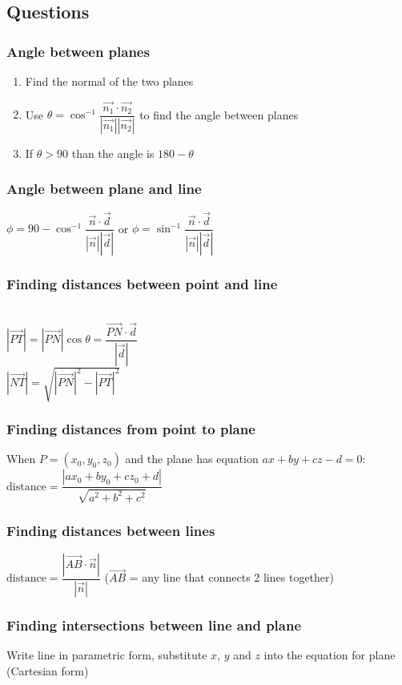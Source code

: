 \subsection{Questions}
\subsubsection{Angle between planes}
\begin{enumerate}
	\item Find the normal of the two planes
	\item Use $\theta = \cos^{-1}\dfrac{\vec{n_1}\cdot\vec{n_2}}{|\vec{n_1}||\vec{n_2}|}$ to find the angle between planes
	\item If $\theta>90$ than the angle is $180-\theta$
\end{enumerate}
\subsubsection{Angle between plane and line}
$\phi = 90-\cos^{-1}\dfrac{\vec{n}\cdot\vec{d}}{|\vec{n}||\vec{d}|}$ or $\phi =\sin^{-1}\dfrac{\vec{n}\cdot\vec{d}}{|\vec{n}||\vec{d}|}$
\subsubsection{Finding distances between point and line}
\\
$|\overrightarrow{PT}| = |\overrightarrow{PN}|\cos \theta = \dfrac{\overrightarrow{PN}\cdot\vec{d}}{|\vec{d}|}$\\ $|\overrightarrow{NT}|=\sqrt{|\overrightarrow{PN}|^2-|\overrightarrow{PT}|^2}$
\subsubsection{Finding distances from point to plane}
When $P=(x_0,y_0,z_0)$ and the plane has equation $ax+by+cz-d=0$:
\begin{math}\text{distance}=\dfrac{|ax_0+by_0+cz_0+d|}{\sqrt{a^2+b^2+c^2}}\end{math}
\subsubsection{Finding distances between lines}
$\text{distance}=\dfrac{|\overrightarrow{AB}\cdot\vec{n}|}{|\vec{n}|}$ ($\overrightarrow{AB}$ = any line that connects 2 lines together)
\subsubsection{Finding intersections between line and plane}
Write line in parametric form, substitute $x$, $y$ and $z$ into the equation for plane (Cartesian form)